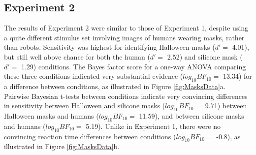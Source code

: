 \documentclass[
]{article}
\begin{document}
\subsection{Experiment 2}\label{experiment-2}

The results of Experiment 2 were similar to those of Experiment 1, despite using a quite different stimulus set involving images of humans wearing masks, rather than robots. Sensitivity was highest for identifying Halloween masks (\(d' =\) 4.01), but still well above chance for both the human (\(d' =\) 2.52) and silicone mask (\(d' =\) 1.29) conditions. The Bayes factor score for a one-way ANOVA comparing these three conditions indicated very substantial evidence (\(log_{10}BF_{10} =\) 13.34) for a difference between conditions, as illustrated in Figure \ref{fig:MasksData}a. Pairwise Bayesian t-tests between conditions indicate very convincing differences in sensitivity between Halloween and silicone masks (\(log_{10}BF_{10} =\) 9.71) between Halloween masks and humans (\(log_{10}BF_{10} =\) 11.59), and between silicone masks and humans (\(log_{10}BF_{10} =\) 5.19). Unlike in Experiment 1, there were no convincing reaction time differences between conditions (\(log_{10}BF_{10} =\) -0.8), as illustrated in Figure \ref{fig:MasksData}b.
\end{document}
